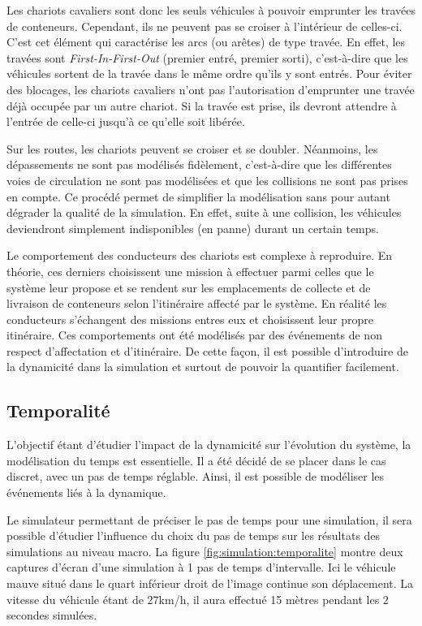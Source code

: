 Les chariots cavaliers sont donc les seuls véhicules à pouvoir emprunter les travées de conteneurs. Cependant, ils ne peuvent pas se croiser à l'intérieur de celles-ci. C'est cet élément qui caractérise les arcs (ou arêtes) de type travée. En effet, les travées sont \textit{First-In-First-Out} (premier entré, premier sorti), c'est-à-dire que les véhicules sortent de la travée dans le même ordre qu'ils y sont entrés. Pour éviter des blocages, les chariots cavaliers n'ont pas l'autorisation d'emprunter une travée déjà occupée par un autre chariot. Si la travée est prise, ils devront attendre à l'entrée de celle-ci jusqu'à ce qu'elle soit libérée.

Sur les routes, les chariots peuvent se croiser et se doubler. Néanmoins, les dépassements ne sont pas modélisés fidèlement, c'est-à-dire que les différentes voies de circulation ne sont pas modélisées et que les collisions ne sont pas prises en compte. Ce procédé permet de simplifier la modélisation sans pour autant dégrader la qualité de la simulation. En effet, suite à une collision, les véhicules deviendront simplement indisponibles (en panne) durant un certain temps.

Le comportement des conducteurs des chariots est complexe à reproduire. En théorie, ces derniers choisissent une mission à effectuer parmi celles que le système leur propose et se rendent sur les emplacements de collecte et de livraison de conteneurs selon l'itinéraire affecté par le système. En réalité les conducteurs s'échangent des missions entres eux et choisissent leur propre itinéraire. Ces comportements ont été modélisés par des événements de non respect d'affectation et d'itinéraire. De cette façon, il est possible d'introduire de la dynamicité dans la simulation et surtout de pouvoir la quantifier facilement.

\subsection{Temporalité}

L'objectif étant d'étudier l'impact de la dynamicité sur l'évolution du système, la modélisation du temps est essentielle. Il a été décidé de se placer dans le cas discret, avec un pas de temps réglable. Ainsi, il est possible de modéliser les événements liés à la dynamique.

Le simulateur permettant de préciser le pas de temps pour une simulation, il sera possible d'étudier l'influence du choix du pas de temps sur les résultats des simulations au niveau macro. La figure \ref{fig:simulation:temporalite} montre deux captures d'écran d'une simulation à 1 pas de temps d'intervalle. Ici le véhicule mauve situé dans le quart inférieur droit de l'image continue son déplacement. La vitesse du véhicule étant de 27km/h, il aura effectué 15 mètres pendant les 2 secondes simulées.

